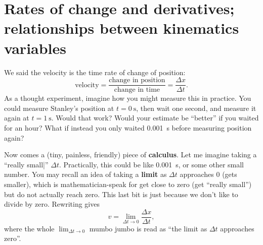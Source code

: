\documentclass{tufte-handout}
\begin{document}
\section{Rates of change and derivatives; relationships between kinematics variables}
We said the velocity is the time rate of change of position:
\begin{equation}
\text{velocity} = \dfrac{\text{change in position}}{\text{change in time}} = \dfrac{\Delta x}{\Delta t}.
\label{eq:derivatives1}
\end{equation}
As a thought experiment, imagine how you might measure this in practice. You could measure Stanley's position at $t=\SI{0}{\second}$, then wait one second, and measure it again at $t=\SI{1}{\second}$. Would that work? Would your estimate be ``better'' if you waited for an hour? What if instead you only waited \SI{0.001}{\second} before measuring position again? 

Now comes a (tiny, painless, friendly) piece of \textbf{calculus}\cite{greenspan1987calculus, kreysig2015advanced}. Let me imagine taking a ``really small|'' $\Delta t$. Practically, this could be like \SI{0.001}{\second}, or some other small number. You may recall an idea of taking a \textbf{limit} as $\Delta t$ approaches 0 (gets smaller), which is mathematician-speak for get close to zero (get ``really small'') but do not actually reach zero. This last bit is just because we don't like to divide by zero. Rewriting  gives
\begin{equation}
v = \lim_{\Delta t\to 0} \dfrac{\Delta x}{\Delta t}, 
\label{eq:derivatives2}
\end{equation}
where the whole $\lim_{\Delta t\to 0}$ mumbo jumbo is read as ``the limit as $\Delta t$ approaches zero''. 
\end{document}
